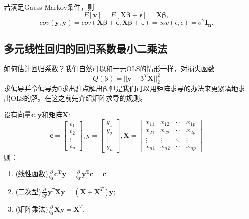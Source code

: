 \documentclass[lang=cn,10pt]{elegantbook}
\begin{document}
    \begin{note}
        \\
        若满足Gauss-Markov条件，则\[E[\mathbf{y}]=E[\mathbf{X\beta+\epsilon}]=\mathbf{X\beta},\]\[cov(\mathbf{y,y})=cov(\mathbf{X\beta+\epsilon,X\beta+\epsilon})=cov(\epsilon,\epsilon)=\sigma^2\mathbf{I_{n}}.\]
    \end{note}
    \subsection{多元线性回归的回归系数最小二乘法}
    如何估计回归系数？我们自然可以和一元OLS的情形一样，对损失函数
    \[Q(\mathbf{\beta})=||\mathbf{y}-\mathbf{\beta}^T\mathbf{X}||_2^2\]
    求偏导并令偏导为0求出驻点解出\(\mathbf{\beta}\),但是我们可以用矩阵求导的办法来更紧凑地求出OLS的解。在这之前先介绍矩阵求导的规则。
    \begin{proposition}[矩阵求导]
        设有向量\(\mathbf{c},\mathbf{y}\)和矩阵\(\mathbf{X}\):
    \[\mathbf{c} =
    \begin{bmatrix}
        c_1\\
        c_2\\
        \vdots\\
        c_n
    \end{bmatrix}
    ,
        \mathbf{y} =
    \begin{bmatrix}
        y_1\\
        y_2\\
        \vdots\\
        y_n
    \end{bmatrix}
    ,
    \mathbf{X} =
    \begin{bmatrix}
        x_{11} & x_{12} & \cdots & x_{1p} \\
        x_{21} & x_{22} & \cdots & x_{2p} \\
        \vdots & \vdots & \ddots & \vdots \\
        x_{n1} & x_{n2} & \cdots & x_{np}
    \end{bmatrix}
    \]
    则：
    \begin{enumerate}
        \item (线性函数)\(\frac{\partial}{\partial \mathbf{y}}\mathbf{c^T\mathbf{y}}=\frac{\partial}{\partial \mathbf{y}}\mathbf{\mathbf{y}^T\mathbf{c}}=\mathbf{c}\);
        \item (二次型)\(\frac{\partial}{\partial \mathbf{y}}\mathbf{y}^T\mathbf{X}\mathbf{y}=(\mathbf{X}+\mathbf{X}^T)\mathbf{y}\);
        \item (矩阵乘法)\(\frac{\partial}{\partial \mathbf{y}}\mathbf{X}\mathbf{y}=\mathbf{X}^T\).
    \end{enumerate}
    \end{proposition}
\end{document}
